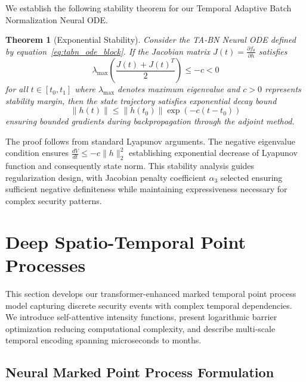 \documentclass[10pt,journal,compsoc]{IEEEtran}
\newtheorem{theorem}{Theorem}
\begin{document}
We establish the following stability theorem for our Temporal Adaptive Batch Normalization Neural ODE.

\begin{theorem}[Exponential Stability]
Consider the TA-BN Neural ODE defined by equation~\eqref{eq:tabn_ode_block}. If the Jacobian matrix $J(t) = \frac{\partial f_\theta}{\partial h}$ satisfies
\begin{equation}
\lambda_{\max}\left(\frac{J(t) + J(t)^T}{2}\right) \leq -c < 0
\end{equation}
for all $t \in [t_0, t_1]$ where $\lambda_{\max}$ denotes maximum eigenvalue and $c > 0$ represents stability margin, then the state trajectory satisfies exponential decay bound
\begin{equation}
\|h(t)\| \leq \|h(t_0)\| \exp(-c(t - t_0))
\end{equation}
ensuring bounded gradients during backpropagation through the adjoint method.
\end{theorem}

The proof follows from standard Lyapunov arguments. The negative eigenvalue condition ensures $\frac{dV}{dt} \leq -c\|h\|_2^2$ establishing exponential decrease of Lyapunov function and consequently state norm. This stability analysis guides regularization design, with Jacobian penalty coefficient $\alpha_3$ selected ensuring sufficient negative definiteness while maintaining expressiveness necessary for complex security patterns.

\section{Deep Spatio-Temporal Point Processes}
\label{sec:point_processes}

This section develops our transformer-enhanced marked temporal point process model capturing discrete security events with complex temporal dependencies. We introduce self-attentive intensity functions, present logarithmic barrier optimization reducing computational complexity, and describe multi-scale temporal encoding spanning microseconds to months.

\subsection{Neural Marked Point Process Formulation}
\end{document}
